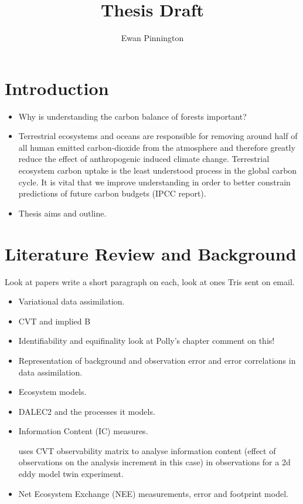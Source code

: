 \documentclass[11pt]{article}
\title{Thesis Draft}
\author{Ewan Pinnington}
\begin{document}
\maketitle

\section{Introduction}
\begin{itemize}
\item Why is understanding the carbon balance of forests important?
\item Terrestrial ecosystems and oceans are responsible for removing around half of all human emitted carbon-dioxide from the atmosphere and therefore greatly reduce the effect of anthropogenic induced climate change. Terrestrial ecosystem carbon uptake is the least understood process in the global carbon cycle. It is vital that we improve understanding in order to better constrain predictions of future carbon budgets (IPCC report).
\item Thesis aims and outline.
\end{itemize}


\section{Literature Review and Background}
Look at papers write a short paragraph on each, look at ones Tris sent on email.
\begin{itemize}
\item Variational data assimilation.
\item CVT and implied B
\item Identifiability and equifinality look at Polly's chapter comment on this!
\item Representation of background and observation error and error correlations in data assimilation.
\item Ecosystem models.
\item DALEC2 and the processes it models.
\item Information Content (IC) measures.

\citet{johnson2005singular} uses CVT observability matrix to analyse information content (effect of observations on the analysis increment in this case) in observations for a 2d eddy model twin experiment. 


\item Net Ecosystem Exchange (NEE) measurements, error and footprint model.
\end{itemize}
\end{document}
